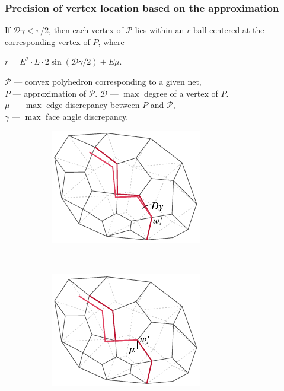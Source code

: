 \renewcommand{\thefootnote}{*}

\def\P{\mathcal P}
\def\ball#1{B_r ( #1 )}

\begin{frame}
\frametitle{Precision of vertex location based on the approximation}
\vspace{0.8mm}

\begin{theorem}
	If $\mathcal D \gamma < \pi / 2$, then each vertex of $\P$ lies within an $r$-ball centered at the \\
	corresponding vertex of $P$, where
	\centerline{$r = E^2 \cdot  L \cdot 2 \sin ( \mathcal D \gamma / 2 ) + E \mu$.}
\end{theorem} \smallskip

	$\P$ — convex polyhedron corresponding to a given net, \\
	$P$ — approximation of $\P$. $\mathcal D$ — $\max$ degree of a vertex of $P$. \\
	$\mu$ — $\max$ edge discrepancy between $P$ and $\P$, \\
	$\gamma$ — $\max$ face angle discrepancy. \\

\begin{figure}
	\centering
	\begin{subfigure}[b]{0.37\columnwidth}
		\centering
		\includegraphics[scale=0.86]{figs_pres/anglePathOffset}
	\end{subfigure}
~
	\begin{subfigure}[b]{0.37\columnwidth}
		\centering
		\includegraphics[scale=0.86]{figs_pres/edgePathOffset}
	\end{subfigure}
\end{figure}
\end{frame}

